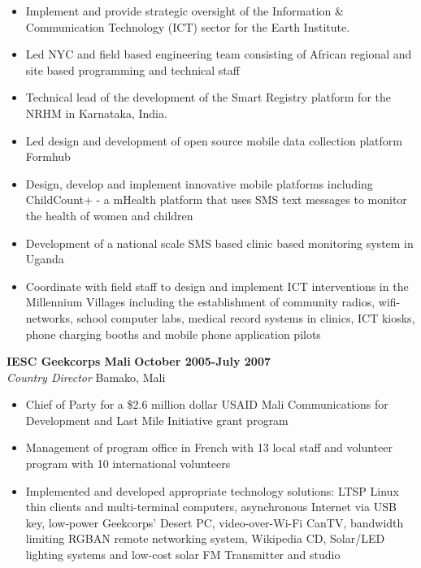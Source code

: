 \documentclass{res}
\begin{document}
\begin{resume}
\begin{itemize} \itemsep -2pt %
        \item Implement and provide strategic oversight of the Information \& Communication Technology (ICT) sector for the Earth Institute.
	\item Led NYC and field based engineering team consisting of African regional and site based programming and technical staff
	\item Technical lead of the development of the Smart Registry platform for the NRHM in Karnataka, India.
        \item Led design and development of open source mobile data collection platform Formhub
	\item Design, develop and implement innovative mobile platforms including ChildCount+ - a mHealth platform that uses SMS text messages to monitor the health of women and children
	\item Development of a national scale SMS based clinic based monitoring system in Uganda
	\item Coordinate with field staff to design and implement ICT interventions in the Millennium Villages including the establishment of community radios, wifi-networks, school computer labs, medical record systems in clinics, ICT kiosks, phone charging booths and mobile phone application pilots
 \end{itemize} \vspace{-4pt}

\textbf{IESC Geekcorps Mali} \hfill        \textbf{October 2005-July 2007} \\
\emph{Country Director}       \hfill   Bamako, Mali
   \begin{itemize} \itemsep -2pt %
	\item Chief of Party for a \$2.6 million dollar USAID Mali Communications for Development and Last Mile Initiative grant program 
	\item Management of program office in French with 13 local staff and volunteer program with 10 international volunteers 
	\item Implemented and developed appropriate technology solutions: LTSP Linux thin clients and multi-terminal computers, 
asynchronous Internet via USB key, low-power Geekcorps’ Desert PC, video-over-Wi-Fi CanTV, bandwidth limiting RGBAN 
remote networking system, Wikipedia CD, Solar/LED lighting systems and low-cost solar FM Transmitter and studio
 \end{itemize} \vspace{-4pt}


\end{resume}
\end{document}
